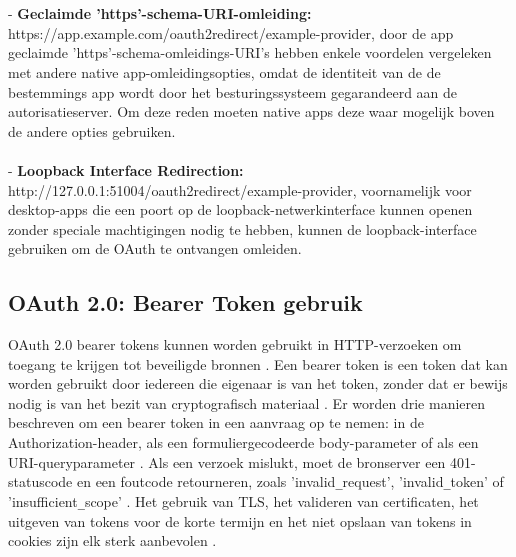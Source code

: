   \\\\
  - \textbf{Geclaimde 'https'-schema-URI-omleiding:} https://app.example.com/oauth2redirect/example-provider, door de app geclaimde 'https'-schema-omleidings-URI's hebben enkele voordelen vergeleken met andere native app-omleidingsopties, omdat de identiteit van de de bestemmings app wordt door het besturingssysteem gegarandeerd aan de autorisatieserver. Om deze reden moeten native apps deze waar mogelijk boven de andere opties gebruiken.
  \\\\
  - \textbf{Loopback Interface Redirection:} http://127.0.0.1:51004/oauth2redirect/example-provider, voornamelijk voor desktop-apps die een poort op de loopback-netwerkinterface kunnen openen zonder speciale machtigingen nodig te hebben, kunnen de loopback-interface gebruiken om de OAuth te ontvangen omleiden.

  
  \subsection{OAuth 2.0: Bearer Token gebruik}%
  \label{subsec:oauth-2.0-bearer-token-gebruik}
  OAuth 2.0 bearer tokens kunnen worden gebruikt in HTTP-verzoeken om toegang te krijgen tot beveiligde bronnen \autocite[p.~{Section 1.0}]{Jones2012}.
  Een bearer token is een token dat kan worden gebruikt door iedereen die eigenaar is van het token, zonder dat er bewijs nodig is van het bezit van cryptografisch materiaal \autocite[p.~{Section 1.2}]{Jones2012}.
  Er worden drie manieren beschreven om een bearer token in een aanvraag op te nemen: in de Authorization-header, als een formuliergecodeerde body-parameter of als een URI-queryparameter \autocite[p.~{Section 2.1}]{Jones2012}. Als een verzoek mislukt, moet de bronserver een 401-statuscode en een foutcode retourneren, zoals 'invalid\verb|_|request', 'invalid\verb|_|token' of 'insufficient\verb|_|scope' \autocite[p.~{Section 3.0}]{Jones2012}.
  Het gebruik van TLS, het valideren van certificaten, het uitgeven van tokens voor de korte termijn en het niet opslaan van tokens in cookies zijn elk sterk aanbevolen \autocite[p.~{Section 5.0}]{Jones2012}.


